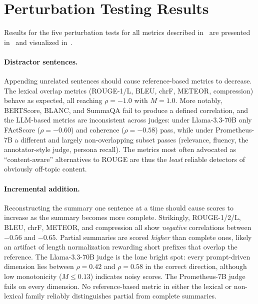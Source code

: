 \section{Perturbation Testing Results \hyperref[chsevenrq1]{\chsevenrqone}}

Results for the five perturbation tests for all metrics described in~ are presented in~ and visualized in~.

\paragraph{Distractor sentences.} Appending unrelated sentences should cause reference-based metrics to decrease. The lexical overlap metrics (ROUGE-1/L, BLEU, chrF, METEOR, compression) behave as expected, all reaching $\rho = -1.0$ with $M = 1.0$. More notably, BERTScore, BLANC, and SummaQA fail to produce a defined correlation, and the LLM-based metrics are inconsistent across judges: under Llama-3.3-70B only FActScore ($\rho = -0.60$) and coherence ($\rho = -0.58$) pass, while under Prometheus-7B a different and largely non-overlapping subset passes (relevance, fluency, the annotator-style judge, persona recall). The metrics most often advocated as ``content-aware'' alternatives to ROUGE are thus the \emph{least} reliable detectors of obviously off-topic content.

\paragraph{Incremental addition.} Reconstructing the summary one sentence at a time should cause scores to increase as the summary becomes more complete. Strikingly, ROUGE-1/2/L, BLEU, chrF, METEOR, and compression all show \emph{negative} correlations between $-0.56$ and $-0.65$. Partial summaries are scored \emph{higher} than complete ones, likely an artifact of length normalization rewarding short prefixes that overlap the reference. The Llama-3.3-70B judge is the lone bright spot: every prompt-driven dimension lies between $\rho = 0.42$ and $\rho = 0.58$ in the correct direction, although low monotonicity ($M \leq 0.13$) indicates noisy scores. The Prometheus-7B judge fails on every dimension. No reference-based metric in either the lexical or non-lexical family reliably distinguishes partial from complete summaries.

